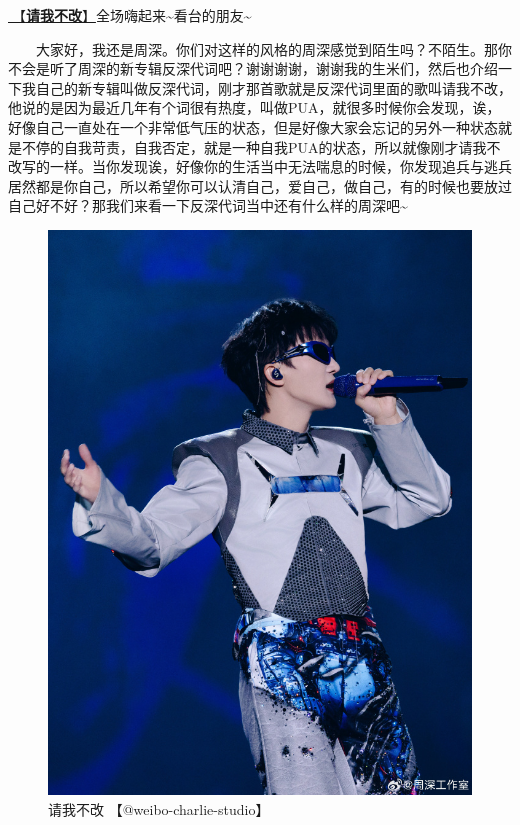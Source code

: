 \documentclass[]{ctexbook}
\begin{document}
\hyperref[brave-heart]{🎵【\textbf{请我不改}】}全场嗨起来\textasciitilde 看台的朋友\textasciitilde{}

  大家好，我还是周深。你们对这样的风格的周深感觉到陌生吗？不陌生。那你不会是听了周深的新专辑反深代词吧？谢谢谢谢，谢谢我的生米们，然后也介绍一下我自己的新专辑叫做反深代词，刚才那首歌就是反深代词里面的歌叫请我不改，他说的是因为最近几年有个词很有热度，叫做PUA，就很多时候你会发现，诶，好像自己一直处在一个非常低气压的状态，但是好像大家会忘记的另外一种状态就是不停的自我苛责，自我否定，就是一种自我PUA的状态，所以就像刚才请我不改写的一样。当你发现诶，好像你的生活当中无法喘息的时候，你发现追兵与逃兵居然都是你自己，所以希望你可以认清自己，爱自己，做自己，有的时候也要放过自己好不好？那我们来看一下反深代词当中还有什么样的周深吧\textasciitilde{}

\begin{figure}

{\centering \includegraphics[width=400pt]{img/beijing20240922/002} 

}

\caption{请我不改 【@weibo-charlie-studio】}\label{fig:unnamed-chunk-104}
\end{figure}
\end{document}
